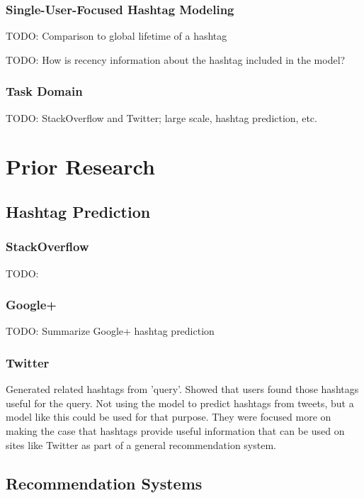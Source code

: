 \documentclass[man]{apa6}
\begin{document}
\subsubsection{Single-User-Focused Hashtag Modeling}

TODO: Comparison to global lifetime of a hashtag \cite{Tsur2012}

TODO: How is recency information about the hashtag included in the model?

\subsubsection{Task Domain}

TODO: StackOverflow and Twitter; large scale, hashtag prediction, etc. 

\section{Prior Research}

\subsection{Hashtag Prediction}

\subsubsection{StackOverflow}

TODO: \cite{Kuo2011}

\subsubsection{Google+}

TODO: Summarize Google+ hashtag prediction \cite{GoogleKeynote2013}

\subsubsection{Twitter}

\cite{Efron2010} Generated related hashtags from 'query'.
Showed that users found those hashtags useful for the query.
Not using the model to predict hashtags from tweets, but a model like this could be used for that purpose.
They were focused more on making the case that hashtags provide useful information that can be used on sites like Twitter as part of a general recommendation system.

\subsection{Recommendation Systems}
\end{document}
